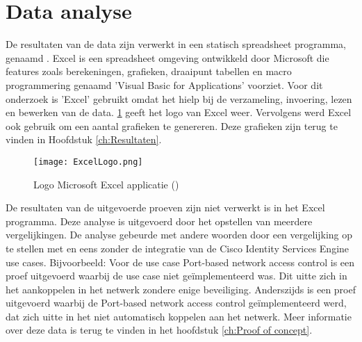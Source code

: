 \section{Data analyse}
\label{sec:Dataanalyse}
De resultaten van de data zijn verwerkt in een statisch spreadsheet programma, genaamd \cite{Excel}. Excel is een spreadsheet omgeving ontwikkeld door Microsoft die features zoals berekeningen, grafieken, draaipunt tabellen en macro programmering genaamd 'Visual Basic for Applications' voorziet. 
Voor dit onderzoek is 'Excel' gebruikt omdat het hielp bij de verzameling, invoering, lezen en bewerken van de data. \ref{fig:SPPS} geeft het logo van Excel weer. Vervolgens werd Excel ook gebruik om een aantal grafieken te genereren. Deze grafieken zijn terug te vinden in Hoofdstuk \ref{ch:Resultaten}.
\begin{figure}[H]
	\centering
	\texttt{[image: ExcelLogo.png]}
	\caption{Logo Microsoft Excel applicatie (\cite{ExcelLogo})}
	\label{fig:SPPS}
\end{figure}
De resultaten van de uitgevoerde proeven zijn niet verwerkt is in het Excel programma. Deze analyse is uitgevoerd door het opstellen van meerdere vergelijkingen. De analyse gebeurde met andere woorden door een vergelijking op te stellen met en eens zonder de integratie van de Cisco Identity Services Engine use cases. Bijvoorbeeld: Voor de use case Port-based network access control is een proef uitgevoerd waarbij de use case niet geïmplementeerd was. Dit uitte zich in het aankoppelen in het netwerk zondere enige beveiliging. Anderszijds is een proef uitgevoerd waarbij de Port-based network access control geïmplementeerd werd, dat zich uitte in het niet automatisch koppelen aan het netwerk.   
\newline
\newline
Meer informatie over deze data is terug te vinden in het hoofdstuk \ref{ch:Proof of concept}.


